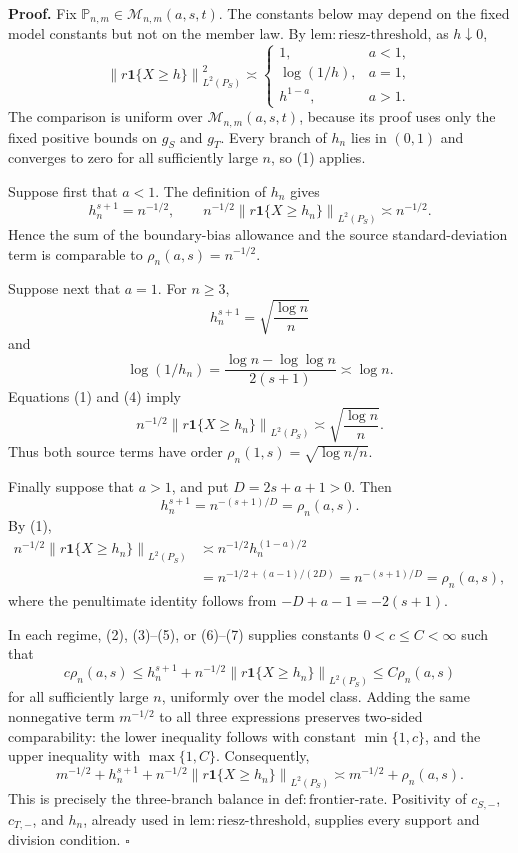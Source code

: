 \textbf{Proof.}
Fix \(\mathbb P_{n,m}\in\mathcal M_{n,m}(a,s,t)\).  The constants below may depend on the fixed model constants but not on the member law.  By \(\mathrm{lem:riesz\text{-}threshold}\), as \(h\downarrow0\),
\[
 \left\|r\mathbf 1\{X\ge h\}\right\|_{L^2(P_S)}^2
 \asymp
 \begin{cases}
  1,&a<1,\\
  \log(1/h),&a=1,\\
  h^{1-a},&a>1.
 \end{cases}
\tag{1}
\]
The comparison is uniform over \(\mathcal M_{n,m}(a,s,t)\), because its proof uses only the fixed positive bounds on \(g_S\) and \(g_T\).  Every branch of \(h_n\) lies in \((0,1)\) and converges to zero for all sufficiently large \(n\), so (1) applies.

Suppose first that \(a<1\).  The definition of \(h_n\) gives
\[
 h_n^{s+1}=n^{-1/2},
 \qquad
 n^{-1/2}\left\|r\mathbf 1\{X\ge h_n\}\right\|_{L^2(P_S)}
 \asymp n^{-1/2}.
\tag{2}
\]
Hence the sum of the boundary-bias allowance and the source standard-deviation term is comparable to \(\rho_n(a,s)=n^{-1/2}\).

Suppose next that \(a=1\).  For \(n\ge3\),
\[
 h_n^{s+1}=\sqrt{\frac{\log n}{n}}
\tag{3}
\]
and
\[
 \log(1/h_n)
 =\frac{\log n-\log\log n}{2(s+1)}
 \asymp\log n.
\tag{4}
\]
Equations (1) and (4) imply
\[
 n^{-1/2}\left\|r\mathbf 1\{X\ge h_n\}\right\|_{L^2(P_S)}
 \asymp\sqrt{\frac{\log n}{n}}.
\tag{5}
\]
Thus both source terms have order \(\rho_n(1,s)=\sqrt{\log n/n}\).

Finally suppose that \(a>1\), and put \(D=2s+a+1>0\).  Then
\[
 h_n^{s+1}=n^{-(s+1)/D}=\rho_n(a,s).
\tag{6}
\]
By (1),
\[
 \begin{aligned}
 n^{-1/2}\left\|r\mathbf 1\{X\ge h_n\}\right\|_{L^2(P_S)}
 &\asymp n^{-1/2}h_n^{(1-a)/2}\\
 &=n^{-1/2+(a-1)/(2D)}
 =n^{-(s+1)/D}
 =\rho_n(a,s),
 \end{aligned}
\tag{7}
\]
where the penultimate identity follows from \(-D+a-1=-2(s+1)\).

In each regime, (2), (3)--(5), or (6)--(7) supplies constants \(0<c\le C<\infty\) such that
\[
 c\rho_n(a,s)
 \le h_n^{s+1}+n^{-1/2}
 \left\|r\mathbf 1\{X\ge h_n\}\right\|_{L^2(P_S)}
 \le C\rho_n(a,s)
\tag{8}
\]
for all sufficiently large \(n\), uniformly over the model class.  Adding the same nonnegative term \(m^{-1/2}\) to all three expressions preserves two-sided comparability: the lower inequality follows with constant \(\min\{1,c\}\), and the upper inequality with \(\max\{1,C\}\).  Consequently,
\[
 m^{-1/2}+h_n^{s+1}+n^{-1/2}
 \left\|r\mathbf 1\{X\ge h_n\}\right\|_{L^2(P_S)}
 \asymp m^{-1/2}+\rho_n(a,s).
\]
This is precisely the three-branch balance in \(\mathrm{def:frontier\text{-}rate}\).  Positivity of \(c_{S,-}\), \(c_{T,-}\), and \(h_n\), already used in \(\mathrm{lem:riesz\text{-}threshold}\), supplies every support and division condition. \(\square\)